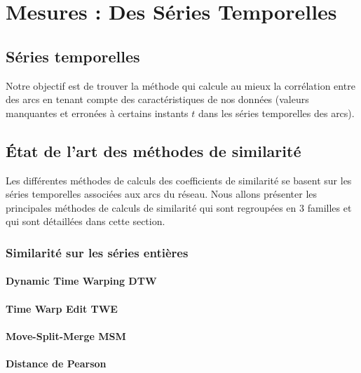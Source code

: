

\chapter{Mesures : Des S\'eries Temporelles}
\label{timeSeries}


\section{S\'eries temporelles}



Notre objectif est de trouver la m\'ethode qui calcule au mieux la corr\'elation entre des arcs en tenant compte des caract\'eristiques de nos donn\'ees (valeurs manquantes et erron\'ees \`a certains instants $t$ dans les s\'eries temporelles des arcs).


\section{\'Etat de l'art des m\'ethodes de similarit\'e}
Les diff\'erentes m\'ethodes de calculs des coefficients de similarit\'e se basent sur les s\'eries temporelles associ\'ees aux arcs du r\'eseau.
Nous allons pr\'esenter les principales m\'ethodes de calculs de similarit\'e qui sont regroup\'ees en $3$ familles et qui sont d\'etaill\'ees dans cette section.
\subsection{ Similarit\'e sur les s\'eries enti\`eres}
	\label{seriesEntieres}
	
	\subsubsection{Dynamic Time Warping  DTW}
		
	\subsubsection{Time Warp Edit TWE}
		
	\subsubsection{Move-Split-Merge MSM}
		
	\subsubsection{Distance de Pearson}
		
